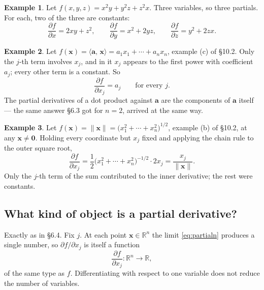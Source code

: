 \documentclass[11pt]{article}
\theoremstyle{plain}
\theoremstyle{definition}
\newtheorem{ex}{Example}[section]
\theoremstyle{remark}
\newcommand{\R}{\mathbb{R}}
\newcommand{\vc}[1]{\mathbf{#1}}
\newcommand{\norm}[1]{\lVert #1\rVert}
\newcommand{\ip}[2]{\langle #1,\, #2\rangle}
\newcommand{\pd}[2]{\frac{\partial #1}{\partial #2}}
\begin{document}
\begin{center}
\end{center}

\begin{ex}
Let $f(x,y,z)=x^{2}y+y^{2}z+z^{2}x$. Three variables, so three partials. For
each, two of the three are constants:
\[
  \pd{f}{x}=2xy+z^{2},
  \qquad
  \pd{f}{y}=x^{2}+2yz,
  \qquad
  \pd{f}{z}=y^{2}+2zx .
\]
\end{ex}

\begin{ex}
Let $f(\vc{x})=\ip{\vc{a}}{\vc{x}}=a_1x_1+\cdots+a_nx_n$, example (c) of \S10.2.
Only the $j$-th term involves $x_j$, and in it $x_j$ appears to the first power
with coefficient $a_j$; every other term is a constant. So
\[
  \pd{f}{x_j}=a_j
  \qquad\text{for every } j .
\]
The partial derivatives of a dot product against $\vc{a}$ are the components of
$\vc{a}$ itself --- the same answer \S6.3 got for $n=2$, arrived at the same way.
\end{ex}

\begin{ex}
Let $f(\vc{x})=\norm{\vc{x}}=\bigl(x_1^{2}+\cdots+x_n^{2}\bigr)^{1/2}$, example
(b) of \S10.2, at any $\vc{x}\neq\vc{0}$. Holding every coordinate but $x_j$
fixed and applying the chain rule to the outer square root,
\[
  \pd{f}{x_j}
  = \frac{1}{2}\bigl(x_1^{2}+\cdots+x_n^{2}\bigr)^{-1/2}\cdot 2x_j
  = \frac{x_j}{\norm{\vc{x}}} .
\]
Only the $j$-th term of the sum contributed to the inner derivative; the rest
were constants.
\end{ex}

\subsection{What kind of object is a partial derivative?}
Exactly as in \S6.4. Fix $j$. At each point $\vc{x}\in\R^{n}$ the limit
\eqref{eq:partialn} produces a single number, so $\partial f/\partial x_j$ is
itself a function
\[
  \pd{f}{x_j}:\R^{n}\longrightarrow\R ,
\]
of the same type as $f$. Differentiating with respect to one variable does not
reduce the number of variables.
\end{document}
